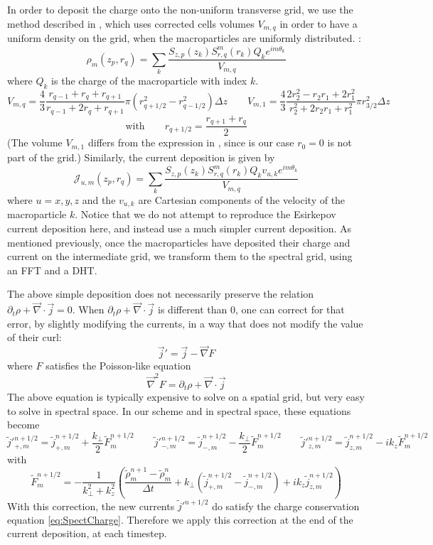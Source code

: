 \documentclass[a4paper]{article}   	%
\begin{document}
In order to deposit the charge onto the non-uniform
transverse grid, we use the method described in \cite{Verboncoeur},
which uses corrected cells volumes $V_{m,q}$ in order to have a
uniform density on the grid, when the macroparticles are uniformly distributed. :
\[ \mathcal{\rho}_m(z_p,r_q) = \sum_k  \frac{S_{z,p}(z_k) S^m_{r,q}(r_k) Q_k e^{im\theta_k}}{V_{m,q}} \]
where $Q_k$ is the charge of the macroparticle with index $k$.
\[ V_{m,q} = \frac{4}{3} \frac{ r_{q-1} + r_q + r_{q+1} }{ r_{q-1}
  + 2r_q + r_{q+1} } \pi (r_{q+1/2}^2 - r_{q-1/2}^2) \Delta z  \qquad
V_{m,1} = \frac{4}{3} \frac{2r_2^2 - r_2r_1 + 2r_1^2}{r_2^2 + 2r_2 r_1 +
  r_1^2 }\pi r_{3/2}^2 \Delta z \]
\[ \mathrm{with} \qquad r_{q+1/2} = \frac{r_{q+1} + r_q}{2}\]
(The volume $V_{m,1}$ differs from the expression in
\cite{Verboncoeur}, since is our case $r_0=0$ is not part of the grid.) Similarly, the current deposition is given by
\[ \mathcal{J}_{u,m}(z_p,r_q) = \sum_k  \frac{S_{z,p}(z_k) S^m_{r,q}(r_k)
Q_k v_{u,k} e^{im\theta_k}}{V_{m,q}} \]
where $u = x,y,z$ and the $v_{u,k}$ are Cartesian components of the
velocity of the macroparticle $k$. Notice that we do not attempt to
reproduce the Esirkepov current deposition here, and instead use a
much simpler current deposition. As mentioned previously, once the
macroparticles have deposited their charge and current on the
intermediate grid, we transform them to the spectral grid, using an
FFT and a DHT.

The above simple deposition does not necessarily
preserve the relation $\partial_t\rho + \vec{\nabla}\cdot\vec{j} =
0$. When $\partial_t\rho + \vec{\nabla}\cdot\vec{j}$ is different than 0,
one can correct for that error, by slightly modifying the currents, in
a way that does not modify the value of their curl:
\[ \vec{j}' = \vec{j} - \vec{\nabla} F \]
where $F$ satisfies the Poisson-like equation
\[ \vec{\nabla}^2 F = \partial_t\rho + \vec{\nabla}\cdot\vec{j} \]
The above equation is typically expensive to solve on a spatial grid, but
very easy to solve in spectral space. In our scheme and in spectral
space, these equations become
\[ \tilde{j}'^{n+1/2}_{+,m} = \tilde{j}^{n+1/2}_{+,m} +
\frac{k_\perp}{2} \tilde{F}^{n+1/2}_m
\qquad
\tilde{j}'^{n+1/2}_{-,m} = \tilde{j}^{n+1/2}_{-,m} - \frac{k_\perp}{2} \tilde{F}^{n+1/2}_m
\qquad \tilde{j}'^{n+1/2}_{z,m} = \tilde{j}^{n+1/2}_{z,m} - ik_z
\tilde{F}^{n+1/2}_m\]
with
\[ \tilde{F}^{n+1/2}_m = - \frac{1}{k_\perp^2 + k_z^2}\left(
  \frac{\tilde{\rho}^{n+1}_m -\tilde{\rho}^{n}_m}{\Delta t} + k_\perp
  (\tilde{j}^{n+1/2}_{+,m} -\tilde{j}^{n+1/2}_{-,m}) + ik_z\tilde{j}^{n+1/2}_{z,m}  \right) \]
With this correction, the new currents $\tilde{j}'^{n+1/2}$ do satisfy
the charge conservation equation \cref{eq:SpectCharge}. Therefore we apply this
correction at the end of the current deposition, at each timestep.
\end{document}
